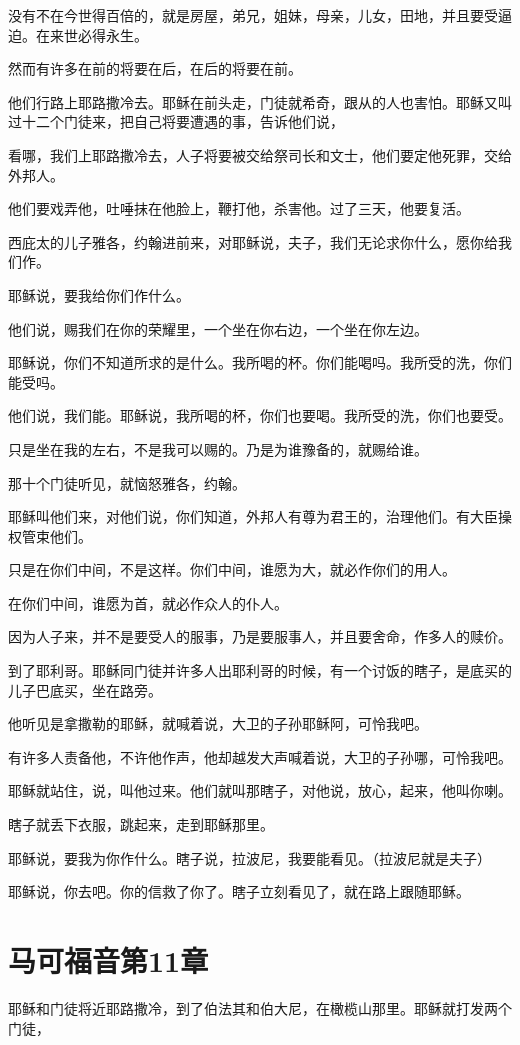 \documentclass[12pt,oneside]{book}
\begin{document}
没有不在今世得百倍的，就是房屋，弟兄，姐妹，母亲，儿女，田地，并且要受逼迫。在来世必得永生。

然而有许多在前的将要在后，在后的将要在前。

他们行路上耶路撒冷去。耶稣在前头走，门徒就希奇，跟从的人也害怕。耶稣又叫过十二个门徒来，把自己将要遭遇的事，告诉他们说，

看哪，我们上耶路撒冷去，人子将要被交给祭司长和文士，他们要定他死罪，交给外邦人。

他们要戏弄他，吐唾抹在他脸上，鞭打他，杀害他。过了三天，他要复活。

西庇太的儿子雅各，约翰进前来，对耶稣说，夫子，我们无论求你什么，愿你给我们作。

耶稣说，要我给你们作什么。

他们说，赐我们在你的荣耀里，一个坐在你右边，一个坐在你左边。

耶稣说，你们不知道所求的是什么。我所喝的杯。你们能喝吗。我所受的洗，你们能受吗。

他们说，我们能。耶稣说，我所喝的杯，你们也要喝。我所受的洗，你们也要受。

只是坐在我的左右，不是我可以赐的。乃是为谁豫备的，就赐给谁。

那十个门徒听见，就恼怒雅各，约翰。

耶稣叫他们来，对他们说，你们知道，外邦人有尊为君王的，治理他们。有大臣操权管束他们。

只是在你们中间，不是这样。你们中间，谁愿为大，就必作你们的用人。

在你们中间，谁愿为首，就必作众人的仆人。

因为人子来，并不是要受人的服事，乃是要服事人，并且要舍命，作多人的赎价。

到了耶利哥。耶稣同门徒并许多人出耶利哥的时候，有一个讨饭的瞎子，是底买的儿子巴底买，坐在路旁。

他听见是拿撒勒的耶稣，就喊着说，大卫的子孙耶稣阿，可怜我吧。

有许多人责备他，不许他作声，他却越发大声喊着说，大卫的子孙哪，可怜我吧。

耶稣就站住，说，叫他过来。他们就叫那瞎子，对他说，放心，起来，他叫你喇。

瞎子就丢下衣服，跳起来，走到耶稣那里。

耶稣说，要我为你作什么。瞎子说，拉波尼，我要能看见。（拉波尼就是夫子）

耶稣说，你去吧。你的信救了你了。瞎子立刻看见了，就在路上跟随耶稣。

\chapter{马可福音第11章}
耶稣和门徒将近耶路撒冷，到了伯法其和伯大尼，在橄榄山那里。耶稣就打发两个门徒，
\end{document}
